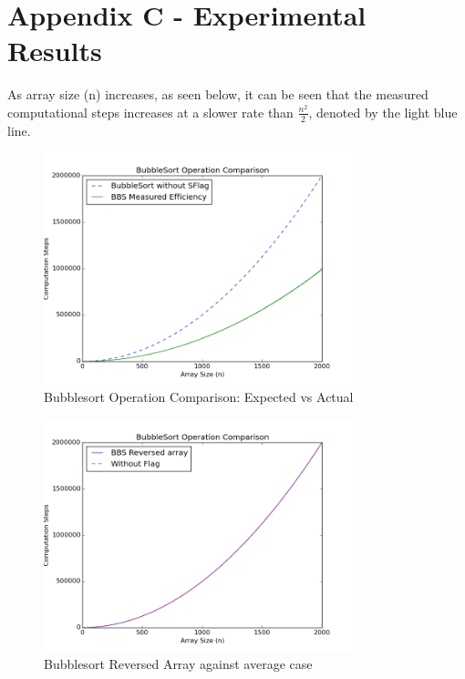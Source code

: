 \documentclass[]{article}
\begin{document}
\section{Appendix C - Experimental Results}
As array size (n) increases, as seen below, it can be seen that the measured computational steps increases at a slower rate than $\frac{n^2}{2}$, denoted by the light blue line. 
\begin{figure}[H]\label{MeasuredRandom}
	\centering
	\caption{Bubblesort Operation Comparison: Expected vs Actual}
	\includegraphics[width=0.8\textwidth]{Random.png}
\end{figure}
\begin{figure}[H]\label{MeasuredReversed}
	\centering
	\caption{Bubblesort Reversed Array against average case}
	\includegraphics[width=0.8\textwidth]{Reversed.png}
\end{figure}


\end{document}
